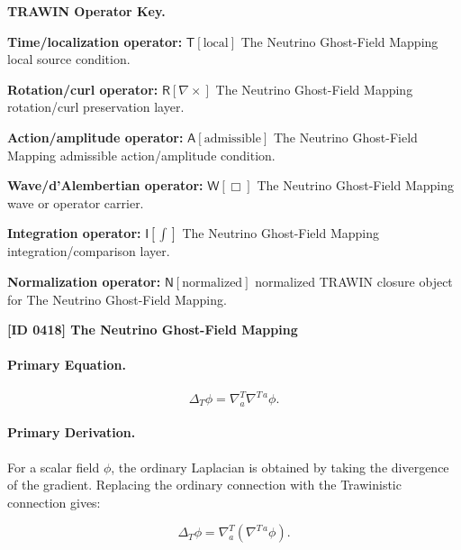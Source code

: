\par\vspace{0.45\baselineskip}
\noindent\begin{minipage}[t]{\linewidth}
\begingroup
\small
\raggedright
\textbf{TRAWIN Operator Key.}\par
\noindent\textbf{Time/localization operator:} $\mathsf{T}\!\left[\mathrm{local}\right]$ The Neutrino Ghost-Field Mapping local source condition.\par
\noindent\textbf{Rotation/curl operator:} $\mathsf{R}\!\left[\nabla\times\right]$ The Neutrino Ghost-Field Mapping rotation/curl preservation layer.\par
\noindent\textbf{Action/amplitude operator:} $\mathsf{A}\!\left[\mathrm{admissible}\right]$ The Neutrino Ghost-Field Mapping admissible action/amplitude condition.\par
\noindent\textbf{Wave/d'Alembertian operator:} $\mathsf{W}\!\left[\Box\right]$ The Neutrino Ghost-Field Mapping wave or operator carrier.\par
\noindent\textbf{Integration operator:} $\mathsf{I}\!\left[\int\right]$ The Neutrino Ghost-Field Mapping integration/comparison layer.\par
\noindent\textbf{Normalization operator:} $\mathsf{N}\!\left[\mathrm{normalized}\right]$ normalized TRAWIN closure object for The Neutrino Ghost-Field Mapping.\par
\endgroup
\end{minipage}

\clearpage
\noindent\textbf{[ID 0418] The Neutrino Ghost-Field Mapping}\par
\vspace{0.35em}
\paragraph{Primary Equation.}
\begin{equation}
\Delta_T\phi
=
\nabla^{T}_{a}\nabla^{T\,a}\phi .
\end{equation}

\paragraph{Primary Derivation.}
For a scalar field $\phi$, the ordinary Laplacian is obtained by taking the divergence of the gradient.  
Replacing the ordinary connection with the Trawinistic connection gives:

\begin{equation}
\Delta_T\phi
=
\nabla^{T}_{a}
\left(
\nabla^{T\,a}\phi
\right).
\end{equation}

